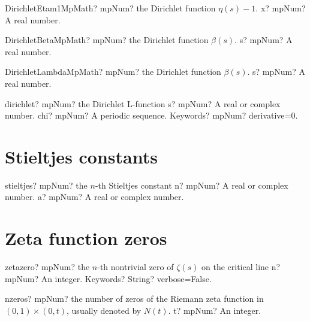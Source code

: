 \documentclass[12pt,a4paper,openany]{book}
\begin{document}
\begin{mpFunctionsExtract}
\mpFunctionOneNotImplemented
{DirichletEtam1MpMath? mpNum? the Dirichlet function $\eta(s) - 1$.}
{x? mpNum? A real number.}
\end{mpFunctionsExtract}

\begin{mpFunctionsExtract}
\mpFunctionOneNotImplemented
{DirichletBetaMpMath? mpNum? the Dirichlet function $\beta(s)$.}
{s? mpNum? A real number.}
\end{mpFunctionsExtract}

\begin{mpFunctionsExtract}
\mpFunctionOneNotImplemented
{DirichletLambdaMpMath? mpNum? the Dirichlet function $\beta(s)$.}
{s? mpNum? A real number.}
\end{mpFunctionsExtract}

\begin{mpFunctionsExtract}
\mpFunctionThree
{dirichlet? mpNum? the Dirichlet L-function}
{s? mpNum? A real or complex number.}
{chi? mpNum? A periodic sequence.}
{Keywords? mpNum? derivative=0.}
\end{mpFunctionsExtract}

\section{Stieltjes constants}

\begin{mpFunctionsExtract}
\mpFunctionTwo
{stieltjes? mpNum? the $n$-th Stieltjes constant}
{n? mpNum? A real or complex number.}
{a? mpNum? A real or complex number.}
\end{mpFunctionsExtract}

\section{Zeta function zeros}

\begin{mpFunctionsExtract}
\mpFunctionTwo
{zetazero? mpNum? the $n$-th nontrivial zero of $\zeta(s)$ on the critical line}
{n? mpNum? An integer.}
{Keywords? String? verbose=False.}
\end{mpFunctionsExtract}

\begin{mpFunctionsExtract}
\mpFunctionOne
{nzeros? mpNum? the number of zeros of the Riemann zeta function in $(0,1) \times (0,t)$, usually denoted by $N(t)$.}
{t? mpNum? An integer.}
\end{mpFunctionsExtract}
\end{document}
